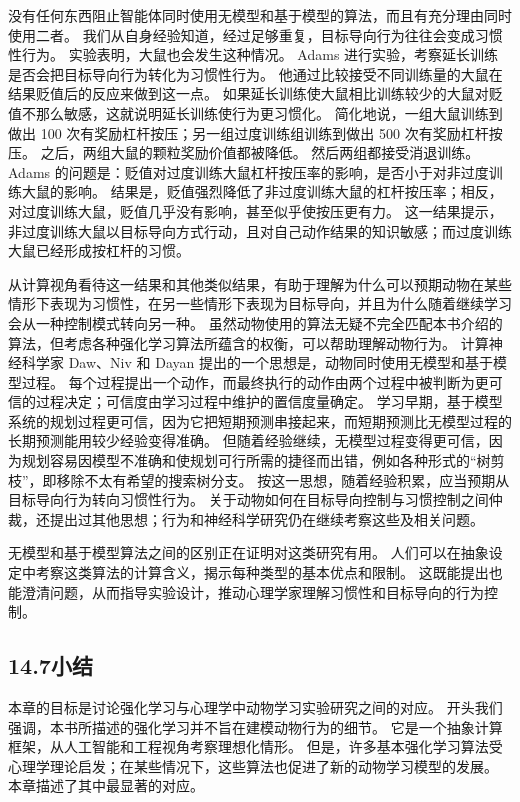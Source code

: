 \documentclass[UTF8,12pt,a4paper,fontset=fandol]{ctexart}
\begin{document}
没有任何东西阻止智能体同时使用无模型和基于模型的算法，而且有充分理由同时使用二者。
我们从自身经验知道，经过足够重复，目标导向行为往往会变成习惯性行为。
实验表明，大鼠也会发生这种情况。
Adams 进行实验，考察延长训练是否会把目标导向行为转化为习惯性行为。
他通过比较接受不同训练量的大鼠在结果贬值后的反应来做到这一点。
如果延长训练使大鼠相比训练较少的大鼠对贬值不那么敏感，这就说明延长训练使行为更习惯化。
简化地说，一组大鼠训练到做出 100 次有奖励杠杆按压；另一组过度训练组训练到做出 500 次有奖励杠杆按压。
之后，两组大鼠的颗粒奖励价值都被降低。
然后两组都接受消退训练。
Adams 的问题是：贬值对过度训练大鼠杠杆按压率的影响，是否小于对非过度训练大鼠的影响。
结果是，贬值强烈降低了非过度训练大鼠的杠杆按压率；相反，对过度训练大鼠，贬值几乎没有影响，甚至似乎使按压更有力。
这一结果提示，非过度训练大鼠以目标导向方式行动，且对自己动作结果的知识敏感；而过度训练大鼠已经形成按杠杆的习惯。

从计算视角看待这一结果和其他类似结果，有助于理解为什么可以预期动物在某些情形下表现为习惯性，在另一些情形下表现为目标导向，并且为什么随着继续学习会从一种控制模式转向另一种。
虽然动物使用的算法无疑不完全匹配本书介绍的算法，但考虑各种强化学习算法所蕴含的权衡，可以帮助理解动物行为。
计算神经科学家 Daw、Niv 和 Dayan 提出的一个思想是，动物同时使用无模型和基于模型过程。
每个过程提出一个动作，而最终执行的动作由两个过程中被判断为更可信的过程决定；可信度由学习过程中维护的置信度量确定。
学习早期，基于模型系统的规划过程更可信，因为它把短期预测串接起来，而短期预测比无模型过程的长期预测能用较少经验变得准确。
但随着经验继续，无模型过程变得更可信，因为规划容易因模型不准确和使规划可行所需的捷径而出错，例如各种形式的“树剪枝”，即移除不太有希望的搜索树分支。
按这一思想，随着经验积累，应当预期从目标导向行为转向习惯性行为。
关于动物如何在目标导向控制与习惯控制之间仲裁，还提出过其他思想；行为和神经科学研究仍在继续考察这些及相关问题。

无模型和基于模型算法之间的区别正在证明对这类研究有用。
人们可以在抽象设定中考察这类算法的计算含义，揭示每种类型的基本优点和限制。
这既能提出也能澄清问题，从而指导实验设计，推动心理学家理解习惯性和目标导向的行为控制。

\subsection*{14.7\quad 小结}

本章的目标是讨论强化学习与心理学中动物学习实验研究之间的对应。
开头我们强调，本书所描述的强化学习并不旨在建模动物行为的细节。
它是一个抽象计算框架，从人工智能和工程视角考察理想化情形。
但是，许多基本强化学习算法受心理学理论启发；在某些情况下，这些算法也促进了新的动物学习模型的发展。
本章描述了其中最显著的对应。
\end{document}
